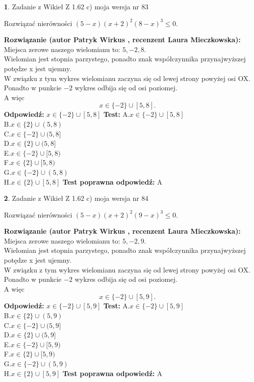 \documentclass[12pt, a4paper]{article}
\theoremstyle{definition} %
\newtheorem{zad}{}
\newcommand{\zadStart}[1]{\begin{zad}#1\newline}
\newcommand{\zadStop}{\end{zad}}
\newcommand{\rozwStart}[2]{\noindent \textbf{Rozwiązanie (autor #1 , recenzent #2): }\newline}
\newcommand{\rozwStop}{\newline}
\newcommand{\odpStart}{\noindent \textbf{Odpowiedź:}\newline}
\newcommand{\odpStop}{\newline}
\newcommand{\testStart}{\noindent \textbf{Test:}\newline}
\newcommand{\testStop}{\newline}
\newcommand{\kluczStart}{\noindent \textbf{Test poprawna odpowiedź:}\newline}
\newcommand{\kluczStop}{\newline}
\begin{document}
\zadStart{Zadanie z Wikieł Z 1.62 c) moja wersja nr 83}

Rozwiązać nierówności $(5-x)(x+2)^{2}(8-x)^{3}\le0$.
\zadStop
\rozwStart{Patryk Wirkus}{Laura Mieczkowska}
Miejsca zerowe naszego wielomianu to: $5, -2, 8$.\\
Wielomian jest stopnia parzystego, ponadto znak współczynnika przy\linebreak najwyższej potędze x jest ujemny.\\ W związku z tym wykres wielomianu zaczyna się od lewej strony powyżej osi OX.\\
Ponadto w punkcie $-2$ wykres odbija się od osi poziomej.\\
A więc $$x \in \{-2\} \cup [5,8].$$
\rozwStop
\odpStart
$x \in \{-2\} \cup [5,8]$
\odpStop
\testStart
A.$x \in \{-2\} \cup [5,8]$\\
B.$x \in \{2\} \cup (5,8)$\\
C.$x \in \{-2\} \cup (5,8]$\\
D.$x \in \{2\} \cup (5,8]$\\
E.$x \in \{-2\} \cup [5,8)$\\
F.$x \in \{2\} \cup [5,8)$\\
G.$x \in \{-2\} \cup (5,8)$\\
H.$x \in \{2\} \cup [5,8]$
\testStop
\kluczStart
A
\kluczStop



\zadStart{Zadanie z Wikieł Z 1.62 c) moja wersja nr 84}

Rozwiązać nierówności $(5-x)(x+2)^{2}(9-x)^{3}\le0$.
\zadStop
\rozwStart{Patryk Wirkus}{Laura Mieczkowska}
Miejsca zerowe naszego wielomianu to: $5, -2, 9$.\\
Wielomian jest stopnia parzystego, ponadto znak współczynnika przy\linebreak najwyższej potędze x jest ujemny.\\ W związku z tym wykres wielomianu zaczyna się od lewej strony powyżej osi OX.\\
Ponadto w punkcie $-2$ wykres odbija się od osi poziomej.\\
A więc $$x \in \{-2\} \cup [5,9].$$
\rozwStop
\odpStart
$x \in \{-2\} \cup [5,9]$
\odpStop
\testStart
A.$x \in \{-2\} \cup [5,9]$\\
B.$x \in \{2\} \cup (5,9)$\\
C.$x \in \{-2\} \cup (5,9]$\\
D.$x \in \{2\} \cup (5,9]$\\
E.$x \in \{-2\} \cup [5,9)$\\
F.$x \in \{2\} \cup [5,9)$\\
G.$x \in \{-2\} \cup (5,9)$\\
H.$x \in \{2\} \cup [5,9]$
\testStop
\kluczStart
A
\kluczStop
\end{document}
